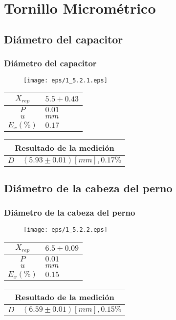 \documentclass[letter,11pt]{beamer}
\begin{document}
\section{Tornillo Micrométrico}

\subsection{Diámetro del capacitor}
\begin{frame}
\frametitle{Diámetro del capacitor}
\vspace*{0.8cm}
\begin{figure}
\centering
\texttt{[image: eps/1\_5.2.1.eps]}
\end{figure}
\vspace*{0.4cm}
\scriptsize
\begin{tabular}{|c|>{\centering}m{1.8cm}<{\centering}|}
\hline
$X_{rep}$ &  $5.5+0.43$ \tabularnewline \hline
      $P$ &      $0.01$ \tabularnewline \hline
      $u$ &        $mm$ \tabularnewline \hline
$E_x(\%)$ &      $0.17$ \tabularnewline \hline
\end{tabular}
\quad
\begin{tabular}{|c|>{\centering}m{5.7cm}<{\centering}|}
\hline
\multicolumn{2}{|c|}{\textbf{Resultado de la medición}} \\ \hline
$D$ & $( 5.93\pm0.01)[mm], 0.17\%$ \tabularnewline \hline
\end{tabular}
\end{frame}

\subsection{Diámetro de la cabeza del perno}
\begin{frame}
\frametitle{Diámetro de la cabeza del perno}
\vspace*{0.8cm}
\begin{figure}
\centering
\texttt{[image: eps/1\_5.2.2.eps]}
\end{figure}
\vspace*{0.4cm}
\scriptsize
\begin{tabular}{|c|>{\centering}m{1.8cm}<{\centering}|}
\hline
$X_{rep}$ &  $6.5+0.09$ \tabularnewline \hline
      $P$ &      $0.01$ \tabularnewline \hline
      $u$ &        $mm$ \tabularnewline \hline
$E_x(\%)$ &      $0.15$ \tabularnewline \hline
\end{tabular}
\quad
\begin{tabular}{|c|>{\centering}m{5.7cm}<{\centering}|}
\hline
\multicolumn{2}{|c|}{\textbf{Resultado de la medición}} \\ \hline
$D$ & $( 6.59\pm0.01)[mm], 0.15\%$ \tabularnewline \hline
\end{tabular}
\end{frame}
\end{document}
